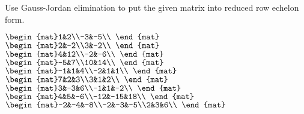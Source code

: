 

\begin{Exercise}[
name={},
title={}, 
difficulty=0,
origin={\cite{GH}}]
Use Gauss-Jordan elimination to put the given matrix into reduced row echelon form.
\begin{multicols}{2}
\Question $\begin{mat}1&2\\-3&-5\\ \end{mat}$
\Question $\begin{mat}2&-2\\3&-2\\ \end{mat}$
\Question $\begin{mat}4&12\\-2&-6\\ \end{mat}$
\Question $\begin{mat}-5&7\\10&14\\ \end{mat}$
\Question $\begin{mat}-1&1&4\\-2&1&1\\ \end{mat}$
\Question $\begin{mat}7&2&3\\3&1&2\\ \end{mat}$
\Question $\begin{mat}3&-3&6\\-1&1&-2\\ \end{mat}$
\Question $\begin{mat}4&5&-6\\-12&-15&18\\ \end{mat}$
\Question $\begin{mat}-2&-4&-8\\-2&-3&-5\\2&3&6\\ \end{mat}$

\end{multicols}
\end{Exercise}
